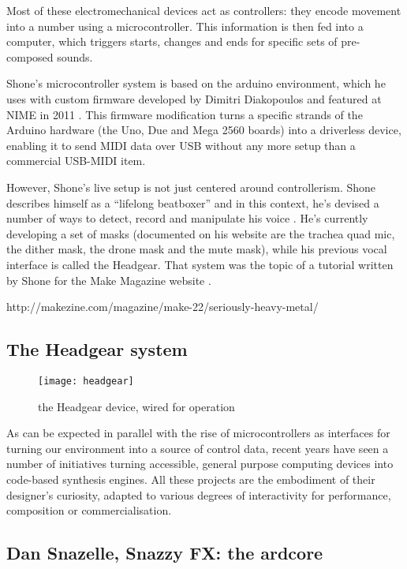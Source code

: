 Most of these electromechanical devices act as controllers: they encode movement into a number using a microcontroller. This information is then fed into a computer, which triggers starts, changes and ends for specific sets of pre-composed sounds. 

Shone's microcontroller system is based on the arduino environment, which he uses with custom firmware developed by Dimitri Diakopoulos and featured at NIME in 2011 \citep{diakopoulos2011,diakopoulos2015} . This firmware modification turns a specific strands of the Arduino hardware (the Uno, Due and Mega 2560 boards) into a driverless device, enabling it to send MIDI data over USB without any more setup than a commercial USB-MIDI item. 

However, Shone's live setup is not just centered around controllerism. Shone describes himself as a ``lifelong beatboxer'' and in this context, he's devised a number of ways to detect, record and manipulate his voice \citep{shone2012}. He's currently developing a set of masks (documented on his website are the trachea quad mic, the dither mask, the drone mask and the mute mask), while his previous vocal interface is called the Headgear. That system was the topic of a tutorial written by Shone for the Make Magazine website \citep{shone2012}. 

http://makezine.com/magazine/make-22/seriously-heavy-metal/

\subsection{The Headgear system}

	\begin{figure}[h!]
	  \caption{the Headgear device, wired for operation}
	  \centering
	    \texttt{[image: headgear]}
	\end{figure}

As can be expected in parallel with the rise of microcontrollers as interfaces for turning our environment into a source of control data, recent years have seen a number of initiatives turning accessible, general purpose computing devices into code-based synthesis engines. All these projects are the embodiment of their designer's curiosity, adapted to various degrees of interactivity for performance, composition or commercialisation. 

\subsection{Dan Snazelle, Snazzy FX: the ardcore}

